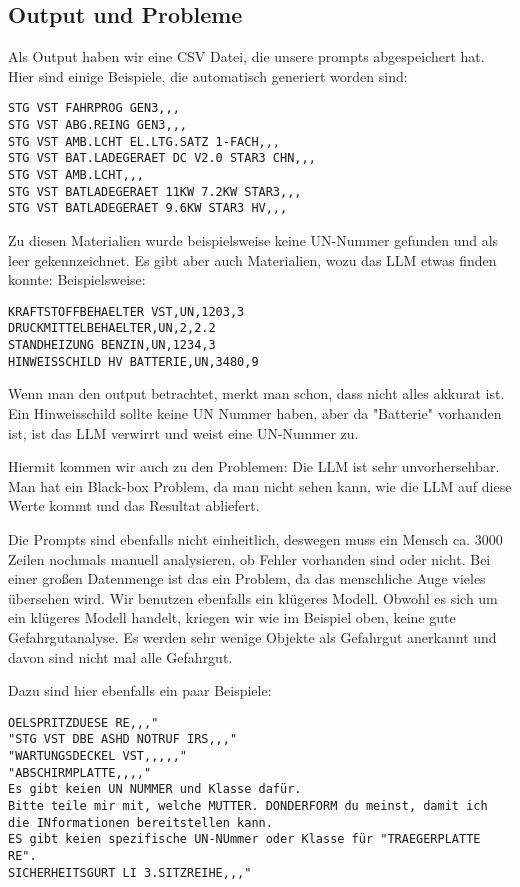 \subsection{Output und Probleme}

Als Output haben wir eine CSV Datei, die unsere prompts abgespeichert hat.
Hier sind einige Beispiele, die automatisch generiert worden sind:

\begin{lstlisting}
STG VST FAHRPROG GEN3,,,
STG VST ABG.REING GEN3,,,
STG VST AMB.LCHT EL.LTG.SATZ 1-FACH,,,
STG VST BAT.LADEGERAET DC V2.0 STAR3 CHN,,,
STG VST AMB.LCHT,,,
STG VST BATLADEGERAET 11KW 7.2KW STAR3,,,
STG VST BATLADEGERAET 9.6KW STAR3 HV,,,
\end{lstlisting}

Zu diesen Materialien wurde beispielsweise keine UN-Nummer gefunden und als
leer gekennzeichnet. Es gibt aber auch Materialien, wozu das LLM etwas finden konnte:
Beispielsweise:

\begin{lstlisting}
KRAFTSTOFFBEHAELTER VST,UN,1203,3
DRUCKMITTELBEHAELTER,UN,2,2.2
STANDHEIZUNG BENZIN,UN,1234,3
HINWEISSCHILD HV BATTERIE,UN,3480,9
\end{lstlisting}

Wenn man den output betrachtet, merkt man schon, dass nicht alles akkurat ist.
Ein Hinweisschild sollte keine UN Nummer haben, aber da "Batterie" vorhanden ist,
ist das LLM verwirrt und weist eine UN-Nummer zu.

Hiermit kommen wir auch zu den Problemen: Die LLM ist sehr unvorhersehbar.
Man hat ein Black-box Problem, da man nicht sehen kann, wie die LLM auf diese Werte
kommt und das Resultat abliefert.

Die Prompts sind ebenfalls nicht einheitlich, deswegen muss ein Mensch ca. 3000 Zeilen
nochmals manuell analysieren, ob Fehler vorhanden sind oder nicht.
Bei einer großen Datenmenge ist das ein Problem, da das menschliche Auge vieles übersehen
wird.
Wir benutzen ebenfalls ein klügeres Modell. Obwohl es sich um ein klügeres Modell handelt,
kriegen wir wie im Beispiel oben, keine gute Gefahrgutanalyse. Es werden sehr wenige
Objekte als Gefahrgut anerkannt und davon sind nicht mal alle Gefahrgut.

Dazu sind hier ebenfalls ein paar Beispiele:

\begin{lstlisting}
OELSPRITZDUESE RE,,,"
"STG VST DBE ASHD NOTRUF IRS,,,"
"WARTUNGSDECKEL VST,,,,,"
"ABSCHIRMPLATTE,,,,"
Es gibt keien UN NUMMER und Klasse dafür.
Bitte teile mir mit, welche MUTTER. DONDERFORM du meinst, damit ich die INformationen bereitstellen kann.
ES gibt keien spezifische UN-NUmmer oder Klasse für "TRAEGERPLATTE RE".
SICHERHEITSGURT LI 3.SITZREIHE,,,"
\end{lstlisting}

